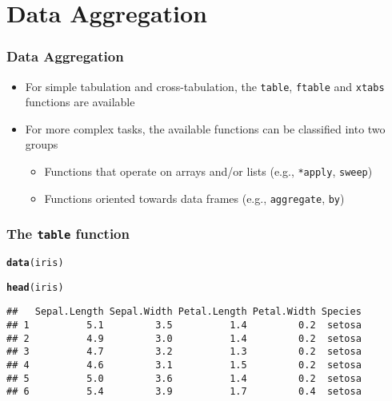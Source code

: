 \documentclass[paper=screen,mathserif]{beamer}\usepackage[]{graphicx}\usepackage[]{color}
\makeatletter
\newcommand{\hlstd}[1]{\textcolor[rgb]{0.345,0.345,0.345}{#1}}%
\newcommand{\hlkwd}[1]{\textcolor[rgb]{0.737,0.353,0.396}{\textbf{#1}}}%
\newenvironment{kframe}{%
 \def\at@end@of@kframe{}%
 \ifinner\ifhmode%
  \def\at@end@of@kframe{\end{minipage}}%
  \begin{minipage}{\columnwidth}%
 \fi\fi%
 \def\FrameCommand##1{\hskip\@totalleftmargin \hskip-\fboxsep
 \colorbox{shadecolor}{##1}\hskip-\fboxsep
     \hskip-\linewidth \hskip-\@totalleftmargin \hskip\columnwidth}%
 \MakeFramed {\advance\hsize-\width
   \@totalleftmargin\z@ \linewidth\hsize
   \@setminipage}}%
 {\par\unskip\endMakeFramed%
 \at@end@of@kframe}
\newenvironment{knitrout}{}{} %
\newcommand{\ft}[1]{\frametitle{#1}}
\makeatother
\begin{document}
\section{Data Aggregation}

\begin{frame}[fragile]
  \ft{Data Aggregation}
  
  \begin{itemize}
  \item For simple tabulation and cross-tabulation, the \verb=table=,
    \verb=ftable= and \verb=xtabs= functions are available
  \item For more complex tasks, the available functions can be
    classified into two groups
    \begin{itemize}
    \item Functions that operate on arrays and/or lists
      (e.g., \verb=*apply=, \verb=sweep=)
    \item Functions oriented towards data frames (e.g.,
      \verb=aggregate=, \verb=by=)
    \end{itemize}
  \end{itemize}
\end{frame}

\begin{frame}[fragile]
  \ft{The {\tt table} function}
  
\begin{knitrout}\small
{}\color{fgcolor}\begin{kframe}
\begin{alltt}
\hlkwd{data}\hlstd{(iris)}

\hlkwd{head}\hlstd{(iris)}
\end{alltt}
\begin{verbatim}
##   Sepal.Length Sepal.Width Petal.Length Petal.Width Species
## 1          5.1         3.5          1.4         0.2  setosa
## 2          4.9         3.0          1.4         0.2  setosa
## 3          4.7         3.2          1.3         0.2  setosa
## 4          4.6         3.1          1.5         0.2  setosa
## 5          5.0         3.6          1.4         0.2  setosa
## 6          5.4         3.9          1.7         0.4  setosa
\end{verbatim}
\end{kframe}
\end{knitrout}
\end{frame}
\end{document}
